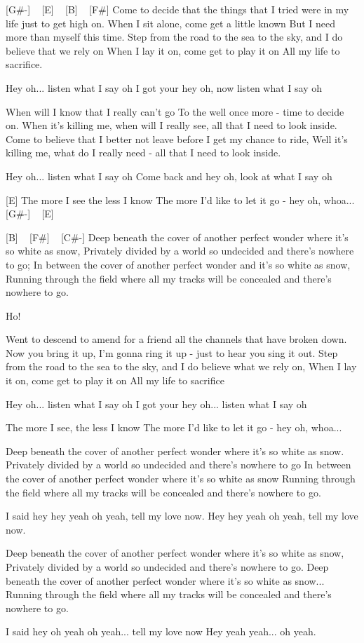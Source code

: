 
[G#-] ~ [E] ~ [B] ~ [F#]
Come to decide that the things that I tried were in my life just to get high on.
When I sit alone, come get a little known
But I need more than myself this time.
Step from the road to the sea to the sky, and I do believe that we rely on
When I lay it on, come get to play it on
All my life to sacrifice.

Hey oh... listen what I say oh
I got your hey oh, now listen what I say oh

When will I know that I really can't go
To the well once more - time to decide on.
When it's killing me, when will I really see, all that I need to look inside.
Come to believe that I better not leave before I get my chance to ride,
Well it's killing me, what do I really need - all that I need to look inside.

Hey oh... listen what I say oh
Come back and hey oh, look at what I say oh

[E]
The more I see the less I know
The more I'd like to let it go - hey oh, whoa...[G#-] ~ [E]

[B] ~ [F#] ~ [C#-]
Deep beneath the cover of another perfect wonder where it's so white as snow,
Privately divided by a world so undecided and there's nowhere to go;
In between the cover of another perfect wonder and it's so white as snow,
Running through the field where all my tracks will be concealed and there's nowhere to go.

Ho!

Went to descend to amend for a friend all the channels that have broken down.
Now you bring it up, I'm gonna ring it up - just to hear you sing it out.
Step from the road to the sea to the sky, and I do believe what we rely on,
When I lay it on, come get to play it on
All my life to sacrifice

Hey oh... listen what I say oh
I got your hey oh... listen what I say oh

The more I see, the less I know
The more I'd like to let it go - hey oh, whoa...

Deep beneath the cover of another perfect wonder where it's so white as snow.
Privately divided by a world so undecided and there's nowhere to go
In between the cover of another perfect wonder where it's so white as snow
Running through the field where all my tracks will be concealed and there's nowhere to go.

I said hey hey yeah oh yeah, tell my love now.
Hey hey yeah oh yeah, tell my love now.

Deep beneath the cover of another perfect wonder where it's so white as snow,
Privately divided by a world so undecided and there's nowhere to go.
Deep beneath the cover of another perfect wonder where it's so white as snow...
Running through the field where all my tracks will be concealed and there's nowhere to go.

I said hey oh yeah oh yeah... tell my love now
Hey yeah yeah... oh yeah. 
